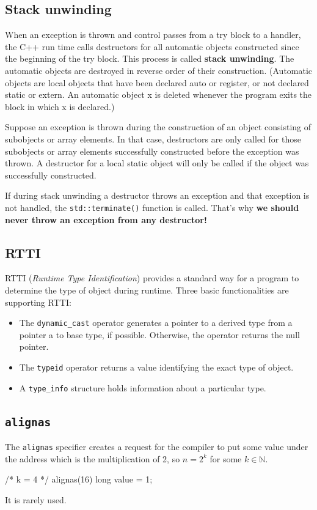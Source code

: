 \documentclass[../main]{subfiles}
\begin{document}
\subsection{Stack unwinding}
    When an exception is thrown and control passes from a try block to a handler, the C++ run time calls destructors for all automatic objects constructed since the beginning of the try block.
This process is called \textbf{stack unwinding}. The automatic objects are destroyed in reverse order of their construction.
(Automatic objects are local objects that have been declared auto or register, or not declared static or extern. An automatic object x is deleted whenever the program exits
the block in which x is declared.)\newline

    Suppose an exception is thrown during the construction of an object consisting of subobjects or array elements. In that case, destructors are only called for those subobjects or array elements
successfully constructed before the exception was thrown. A destructor for a local static object will only be called if the object was successfully constructed.\newline

    If during stack unwinding a destructor throws an exception and that exception is not handled, the \texttt{std::terminate()} function is called. That's why \textbf{we should never throw an exception
from any destructor!}

\subsection{RTTI}
    RTTI (\textit{Runtime Type Identification}) provides a standard way for a program to determine the type of object during runtime. Three basic functionalities are supporting RTTI:
\begin{itemize}
    \item The \texttt{dynamic\_cast} operator generates a pointer to a derived type from a pointer a to base type, if possible. Otherwise, the operator returns the null pointer.
    \item The \texttt{typeid} operator returns a value identifying the exact type of object.
    \item A \texttt{type\_info} structure holds information about a particular type.
\end{itemize}

\subsection{\texttt{alignas}}
The \texttt{alignas} specifier creates a request for the compiler to put some value under the address which is the multiplication of 2, so $n = 2^k$ for some $k \in \mathbb{N}$.
\begin{Code}
    /* k = 4 */
    alignas(16) long value = 1;
\end{Code}
\noindent
It is rarely used.
\end{document}
